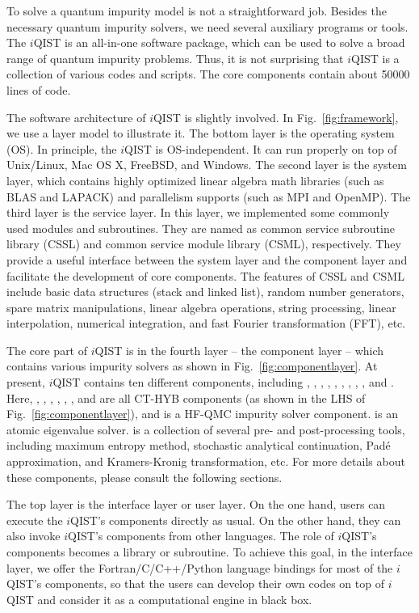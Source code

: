 To solve a quantum impurity model is not a straightforward job. Besides the necessary quantum impurity solvers, we need several auxiliary programs or tools. The $i$QIST is an all-in-one software package, which can be used to solve a broad range of quantum impurity problems. Thus, it is not surprising that $i$QIST is a collection of various codes and scripts. The core components contain about 50000 lines of code. 

The software architecture of $i$QIST is slightly involved. In Fig.~\ref{fig:framework}, we use a layer model to illustrate it. The bottom layer is the operating system (OS). In principle, the $i$QIST is OS-independent. It can run properly on top of Unix/Linux, Mac OS X, FreeBSD, and Windows. The second layer is the system layer, which contains highly optimized linear algebra math libraries (such as BLAS and LAPACK) and parallelism supports (such as MPI and OpenMP). The third layer is the service layer. In this layer, we implemented some commonly used modules and subroutines. They are named as common service subroutine library (CSSL) and common service module library (CSML), respectively. They provide a useful interface between the system layer and the component layer and facilitate the development of core components. The features of CSSL and CSML include basic data structures (stack and linked list), random number generators, spare matrix manipulations, linear algebra operations, string processing, linear interpolation, numerical integration, and fast Fourier transformation (FFT), etc. 

The core part of $i$QIST is in the fourth layer -- the component layer -- which contains various impurity solvers as shown in Fig.~\ref{fig:componentlayer}. At present, $i$QIST contains ten different components, including {\azalea}, {\gardenia}, {\narcissus}, {\begonia}, {\lavender}, {\pansy}, {\manjushaka}, {\daisy}, {\jasmine}, and {\hibiscus}. Here, {\azalea}, {\gardenia}, {\narcissus}, {\begonia}, {\lavender}, {\pansy}, and {\manjushaka} are all CT-HYB components (as shown in the LHS of Fig.~\ref{fig:componentlayer}), and {\daisy} is a HF-QMC impurity solver component. {\jasmine} is an atomic eigenvalue solver. {\hibiscus} is a collection of several pre- and post-processing tools, including maximum entropy method, stochastic analytical continuation, Pad\'{e} approximation, and Kramers-Kronig transformation, etc. For more details about these components, please consult the following sections. 

The top layer is the interface layer or user layer. On the one hand, users can execute the $i$QIST's components directly as usual. On the other hand, they can also invoke $i$QIST's components from other languages. The role of $i$QIST's components becomes a library or subroutine. To achieve this goal, in the interface layer, we offer the Fortran/C/C++/Python language bindings for most of the $i$QIST's components, so that the users can develop their own codes on top of $i$QIST and consider it as a computational engine in black box.

